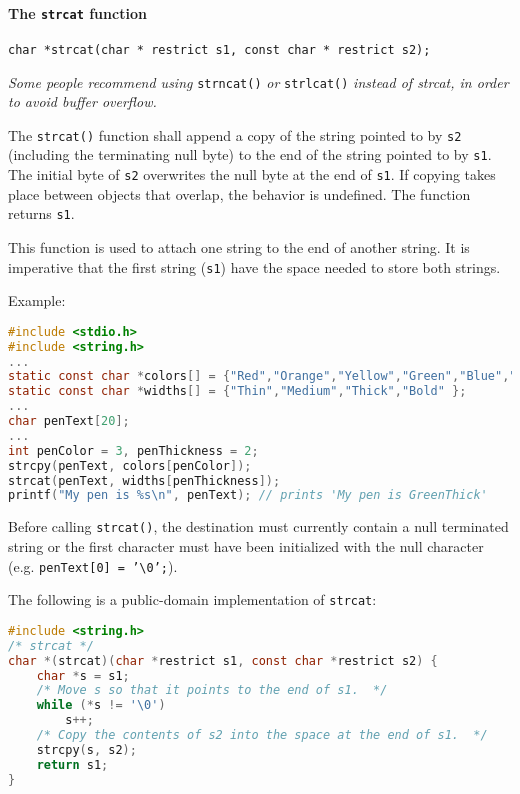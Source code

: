 \paragraph{The \texttt{strcat} function}
\texttt{char *strcat(char * restrict s1, const char * restrict s2);}

\emph{Some people recommend using} \texttt{strncat()} \emph{or}
\texttt{strlcat()} \emph{instead of strcat, in order to avoid buffer overflow.}

The \texttt{strcat()} function shall append a copy of the string pointed to by
\texttt{s2} (including the terminating null byte) to the end of the string
pointed to by \texttt{s1}. The initial byte of \texttt{s2} overwrites the null
byte at the end of \texttt{s1}. If copying takes place between objects that
overlap, the behavior is undefined. The function returns \texttt{s1}.

This function is used to attach one string to the end of another string. It is
imperative that the first string (\texttt{s1}) have the space needed to store
both strings.

Example:
\lstset{basicstyle=\scriptsize, numbers=left, captionpos=b, tabsize=4}
\begin{lstlisting}[caption=Section \thesection listing \arabic{stringcnt},language={C},
breaklines=true,xleftmargin=15pt,label=lst:section\thesection listing\arabic{stringcnt}]
#include <stdio.h>
#include <string.h>
...
static const char *colors[] = {"Red","Orange","Yellow","Green","Blue","Purple" };
static const char *widths[] = {"Thin","Medium","Thick","Bold" };
...
char penText[20];
...
int penColor = 3, penThickness = 2;
strcpy(penText, colors[penColor]);
strcat(penText, widths[penThickness]);
printf("My pen is %s\n", penText); // prints 'My pen is GreenThick'
\end{lstlisting}

Before calling \texttt{strcat()}, the destination must currently contain a null
terminated string or the first character must have been initialized with the
null character (e.g. \texttt{penText[0] = '\textbackslash{}0';}).

The following is a public-domain implementation of \texttt{strcat}:
\lstset{basicstyle=\scriptsize, numbers=left, captionpos=b, tabsize=4}
\begin{lstlisting}[caption=Section \thesection listing \arabic{stringcnt},language={C},
breaklines=true,xleftmargin=15pt,label=lst:section\thesection listing\arabic{stringcnt}]
#include <string.h>
/* strcat */
char *(strcat)(char *restrict s1, const char *restrict s2) {
	char *s = s1;
	/* Move s so that it points to the end of s1.  */
	while (*s != '\0')
	    s++;
	/* Copy the contents of s2 into the space at the end of s1.  */
	strcpy(s, s2);
	return s1;
}
\end{lstlisting}

